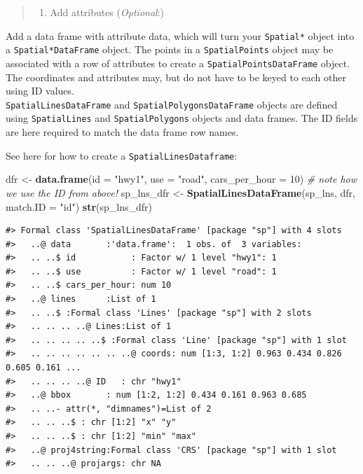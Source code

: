 \documentclass[]{book}
\newenvironment{Shaded}{\begin{snugshade}}{\end{snugshade}}
\newcommand{\KeywordTok}[1]{\textcolor[rgb]{0.13,0.29,0.53}{\textbf{#1}}}
\newcommand{\DataTypeTok}[1]{\textcolor[rgb]{0.13,0.29,0.53}{#1}}
\newcommand{\DecValTok}[1]{\textcolor[rgb]{0.00,0.00,0.81}{#1}}
\newcommand{\StringTok}[1]{\textcolor[rgb]{0.31,0.60,0.02}{#1}}
\newcommand{\CommentTok}[1]{\textcolor[rgb]{0.56,0.35,0.01}{\textit{#1}}}
\newcommand{\NormalTok}[1]{#1}
\providecommand{\tightlist}{%
  \setlength{\itemsep}{0pt}\setlength{\parskip}{0pt}}
\theoremstyle{definition}
\theoremstyle{definition}
\theoremstyle{definition}
\theoremstyle{remark}
\begin{document}
\begin{quote}
\begin{enumerate}
\def\labelenumi{\Roman{enumi}.}
\setcounter{enumi}{2}
\tightlist
\item
  Add attributes (\emph{Optional}:)
\end{enumerate}
\end{quote}

Add a data frame with attribute data, which will turn your
\texttt{Spatial*} object into a \texttt{Spatial*DataFrame} object. The
points in a \texttt{SpatialPoints} object may be associated with a row
of attributes to create a \texttt{SpatialPointsDataFrame} object. The
coordinates and attributes may, but do not have to be keyed to each
other using ID values.\\
\texttt{SpatialLinesDataFrame} and \texttt{SpatialPolygonsDataFrame}
objects are defined using \texttt{SpatialLines} and
\texttt{SpatialPolygons} objects and data frames. The ID fields are here
required to match the data frame row names.

See here for how to create a \texttt{SpatialLinesDataframe}:

\begin{Shaded}
\begin{Highlighting}[]
\NormalTok{dfr <-}\StringTok{ }\KeywordTok{data.frame}\NormalTok{(}\DataTypeTok{id =} \StringTok{"hwy1"}\NormalTok{, }\DataTypeTok{use =} \StringTok{"road"}\NormalTok{, }\DataTypeTok{cars_per_hour =} \DecValTok{10}\NormalTok{) }\CommentTok{# note how we use the ID from above!}
\NormalTok{sp_lns_dfr <-}\StringTok{ }\KeywordTok{SpatialLinesDataFrame}\NormalTok{(sp_lns, dfr, }\DataTypeTok{match.ID =} \StringTok{"id"}\NormalTok{)}
\KeywordTok{str}\NormalTok{(sp_lns_dfr)}
\end{Highlighting}
\end{Shaded}

\begin{verbatim}
#> Formal class 'SpatialLinesDataFrame' [package "sp"] with 4 slots
#>   ..@ data       :'data.frame':  1 obs. of  3 variables:
#>   .. ..$ id           : Factor w/ 1 level "hwy1": 1
#>   .. ..$ use          : Factor w/ 1 level "road": 1
#>   .. ..$ cars_per_hour: num 10
#>   ..@ lines      :List of 1
#>   .. ..$ :Formal class 'Lines' [package "sp"] with 2 slots
#>   .. .. .. ..@ Lines:List of 1
#>   .. .. .. .. ..$ :Formal class 'Line' [package "sp"] with 1 slot
#>   .. .. .. .. .. .. ..@ coords: num [1:3, 1:2] 0.963 0.434 0.826 0.605 0.161 ...
#>   .. .. .. ..@ ID   : chr "hwy1"
#>   ..@ bbox       : num [1:2, 1:2] 0.434 0.161 0.963 0.685
#>   .. ..- attr(*, "dimnames")=List of 2
#>   .. .. ..$ : chr [1:2] "x" "y"
#>   .. .. ..$ : chr [1:2] "min" "max"
#>   ..@ proj4string:Formal class 'CRS' [package "sp"] with 1 slot
#>   .. .. ..@ projargs: chr NA
\end{verbatim}
\end{document}

